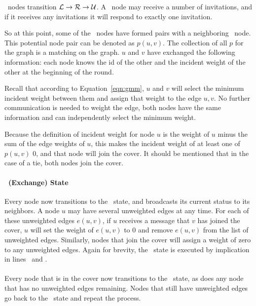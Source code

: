 \cLd\ nodes transition ${\mathcal L} \rightarrow {\mathcal R} \rightarrow {\mathcal U}$. A \cLd\ node may receive a number of invitations, and if it receives any invitations it will respond to exactly one invitation.

So at this point, some of the \cId\ nodes have formed pairs with a neighboring \cLd\ node. This potential node pair can be denoted as $p(u,v)$. The collection of all $p$ for the graph is a matching on the graph. $u$ and $v$ have exchanged the following information: each node knows the id of the other and the incident weight of the other at the beginning of the round.

Recall that according to Equation~\eqref{eqn:gmm}, $u$ and $v$ will select the minimum incident weight between them and assign that weight to the edge $u,v$. No further communication is needed to weight the edge, both nodes have the same information and can independently select the minimum weight. 

Because the definition of incident weight for node $u$ is the weight of $u$ minus the sum of the edge weights of $u$, this makes the incident weight of at least one of $p(u,v)$ 0, and that node will join the cover. It should be mentioned that in the case of a tie, both nodes join the cover.

\paragraph{\cEd\ (Exchange) State}
Every node now transitions to the \cEd\ state, and broadcasts its current status to its neighbors. A node $u$ may have several unweighted edges at any time. For each of these unweighted edges $e(u,v)$, if $u$ receives a message that $v$ has joined the cover, $u$ will set the weight of $e(u,v)$ to 0 and remove $e(u,v)$ from the list of unweighted edges. Similarly, nodes that join the cover will assign a weight of zero to any unweighted edges. Again for brevity, the \cEd\ state is executed by implication in lines~ and .

\paragraph{}Every node that is in the cover now transitions to the \cDd\ state, as does any node that has no unweighted edges remaining. Nodes that still have unweighted edges go back to the \cCd\ state and repeat the process. 
